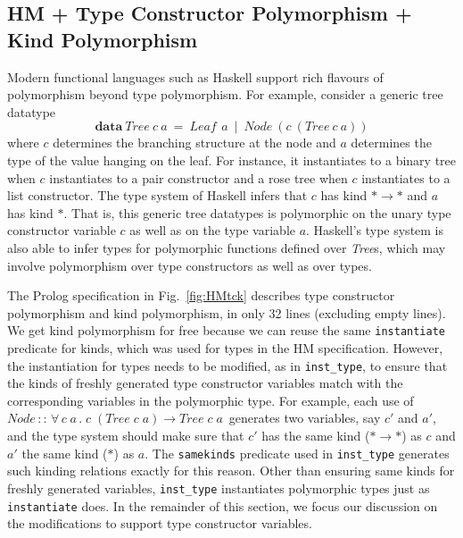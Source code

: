 \documentclass[runningheads,a4paper]{llncs}
\begin{document}
\subsection{HM + Type Constructor Polymorphism + Kind Polymorphism}
\label{ssec:HMtck}
Modern functional languages such as Haskell support rich flavours of
polymorphism beyond type polymorphism. For example, consider
a generic tree datatype
\[ \textbf{data}~\textit{Tree}~c~a
  ~=~ \textit{Leaf}\,~a ~\mid~ \textit{Node}~(c~(\textit{Tree}~c~a)) \]
where $c$ determines the branching structure at the node and $a$
determines the type of the value hanging on the leaf. For instance,
it instantiates to a binary tree when $c$ instantiates to a pair constructor
and a rose tree when $c$ instantiates to a list constructor.
The type system of Haskell infers that $c$ has kind $*\to*$ and
$a$ has kind $*$. That is, this generic tree datatypes is polymorphic on
the unary type constructor variable $c$ as well as on the type variable $a$.
Haskell's type system is also able to infer types for polymorphic functions
defined over \textit{Tree}s, which may involve polymorphism over
type constructors as well as over types.

The Prolog specification in Fig.~\ref{fig:HMtck} describes
type constructor polymorphism and kind polymorphism, in only 32 lines
(excluding empty lines). We get kind polymorphism for free because
we can reuse the same \verb|instantiate| predicate for kinds, which was
used for types in the HM specification. However, the instantiation for
types needs to be modified, as in \verb|inst_type|, to ensure that
the kinds of freshly generated type constructor variables match with
the corresponding variables in the polymorphic type. For example, each use of
$\textit{Node}\,::\,
 \forall\,c\;a\,.\;c\;(\textit{Tree}\;c\;a)\to\textit{Tree}\;c\;a\,$
generates two variables, say $c'$ and $a'$, and the type system should make sure
that $c'$ has the same kind ($*\to*$) as $c$ and $a'$ the same kind ($*$) as $a$.
The \verb|samekinds| predicate used in \verb|inst_type| generates such
kinding relations exactly for this reason. Other than ensuring same kinds for
freshly generated variables, \verb|inst_type| instantiates polymorphic types
just as \verb|instantiate| does. In the remainder of this section, we focus
our discussion on the modifications to support type constructor variables.
\end{document}

